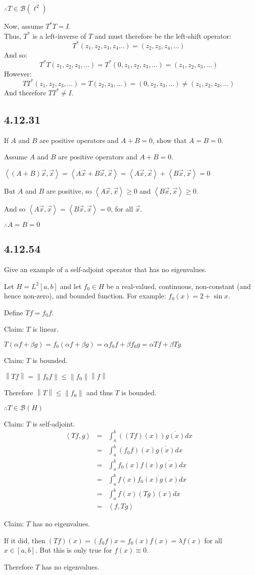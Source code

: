 \documentclass[letterpaper,12pt,fleqn]{article}
\newcommand{\vx}{\vec{x}}
\newcommand{\norm}[1]{\left\|#1\right\|}
\newcommand{\inner}[1]{\left<#1\right>}
\newcommand{\conj}[1]{\overline{#1}}
\newcommand{\mb}{\mathcal{B}}
\renewcommand{\a}{\alpha}
\renewcommand{\b}{\beta}
\renewcommand{\l}{\lambda}
\begin{document}
$\therefore T\in\mb(\ell^2)$

Now, assume $T^*T=I$. \\
Thus, $T^*$ is a left-inverse of $T$ and must therefore be the left-shift
operator:
\[T^*(z_1,z_2,z_3,z_4\ldots)=(z_2,z_3,z_4,\ldots)\]
And so:
\[T^*T(z_1,z_2,z_3,\ldots)=T^*(0,z_1,z_2,z_3,\ldots)=(z_1,z_2,z_3,\ldots)\]
However:
\[TT^*(z_1,z_2,z_3,\ldots)=T(z_2,z_3,\ldots)=(0,z_2,z_3,\ldots)\ne
(z_1,z_2,z_3,\ldots)\]
And therefore $TT^*\ne I$.

\subsection*{4.12.31}

If $A$ and $B$ are positive operators and $A+B=0$, show that $A=B=0$.

Assume $A$ and $B$ are positive operators and $A+B=0$.

$\inner{(A+B)\vx,\vx}=\inner{A\vx+B\vx,\vx}=
\inner{A\vx,\vx}+\inner{B\vx,\vx}=0$

But $A$ and $B$ are positive, so $\inner{A\vx,\vx}\ge0$ and
$\inner{B\vx,\vx}\ge0$.

And so $\inner{A\vx,\vx}=\inner{B\vx,\vx}=0$, for all $\vx$.

$\therefore A=B=0$

\subsection*{4.12.54}

Give an example of a self-adjoint operator that has no eigenvalues.

Let $H=L^2[a,b]$ and let $f_0\in H$ be a real-valued, continuous, non-constant
(and hence non-zero), and bounded function. For example: $f_0(x)=2+\sin x$.

Define $Tf=f_0f$.

Claim: $T$ is linear.

$T(\a f+\b g)=f_0(\a f+\b g)=\a f_0f+\b f_0g=\a Tf+\b Tg$

Claim: $T$ is bounded.

$\norm{Tf}=\norm{f_0f}\le\norm{f_0}\norm{f}$

Therefore $\norm{T}\le\norm{f_0}$ and thus $T$ is bounded.

$\therefore T\in\mb(H)$

Claim: $T$ is self-adjoint.
\begin{eqnarray*}
  \inner{Tf,g} &=& \int_a^b((Tf)(x))\conj{g(x)}dx \\
  &=& \int_a^b(f_0f)(x)\conj{g(x)}dx \\
  &=& \int_a^bf_0(x)f(x)\conj{g(x)}dx \\
  &=& \int_a^bf(x)\conj{f_0(x)g(x)}dx \\
  &=& \int_a^bf(x)\conj{(Tg)(x)}dx \\
  &=& \inner{f,Tg}
\end{eqnarray*}

Claim: $T$ has no eigenvalues.

If it did, then $(Tf)(x)=(f_0f)x=f_0(x)f(x)=\l f(x)$ for all $x\in[a,b]$.
But this is only true for $f(x)\equiv0$.

Therefore $T$ has no eigenvalues.
\end{document}
